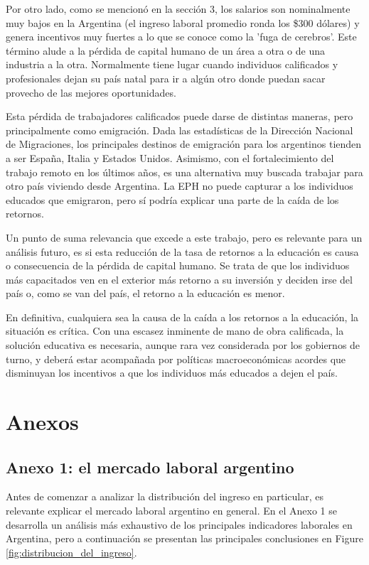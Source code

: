 \documentclass[a4paper]{article}
\theoremstyle{plain}
\theoremstyle{definition}
\begin{document}
Por otro lado, como se mencionó en la sección 3, los salarios son nominalmente muy bajos en la Argentina (el ingreso laboral promedio ronda los \$300 dólares)  y genera incentivos muy fuertes a lo que se conoce como la 'fuga de cerebros'. Este término alude a la pérdida de capital humano de un área a otra o de una industria a la otra. Normalmente tiene lugar cuando individuos calificados y profesionales dejan su país natal para ir a algún otro donde puedan sacar provecho de las mejores oportunidades.

Esta pérdida de trabajadores calificados puede darse de distintas maneras, pero principalmente como emigración. Dada las estadísticas de la Dirección Nacional de Migraciones, los principales destinos de emigración para los argentinos tienden a ser España, Italia y Estados Unidos. Asimismo, con el fortalecimiento del trabajo remoto en los últimos años, es una alternativa muy buscada trabajar para otro país viviendo desde Argentina. La EPH no puede capturar a los individuos educados que emigraron, pero sí podría explicar una parte de la caída de los retornos. 

Un punto de suma relevancia que excede a este trabajo, pero es relevante para un análisis futuro, es si esta reducción de la tasa de retornos a la educación es causa o consecuencia de la pérdida de capital humano. Se trata de que los individuos más capacitados ven en el exterior más retorno a su inversión y deciden irse del país o, como se van del país, el retorno a la educación es menor. 

En definitiva, cualquiera sea la causa de la caída a los retornos a la educación, la situación es crítica. Con una escasez inminente de mano de obra calificada, la solución educativa es necesaria, aunque rara vez considerada por los gobiernos de turno, y deberá estar acompañada por políticas macroeconómicas acordes que disminuyan los incentivos a que los individuos más educados a dejen el país.  

\newpage
\section{Anexos}
\subsection{Anexo 1: el mercado laboral argentino}

Antes de comenzar a analizar la distribución del ingreso en particular, es relevante explicar el mercado laboral argentino en general. En el Anexo 1 se desarrolla un análisis más exhaustivo de los principales indicadores laborales en Argentina, pero a continuación se presentan las principales conclusiones en Figure \ref{fig:distribucion_del_ingreso}. 
\end{document}
